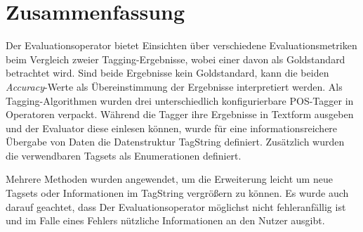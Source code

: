 \section{Zusammenfassung}
\label{sec:system:conclusion}

Der Evaluationsoperator bietet Einsichten über verschiedene Evaluationsmetriken beim Vergleich zweier Tagging-Ergebnisse, wobei einer davon als Goldstandard betrachtet wird. Sind beide Ergebnisse kein Goldstandard, kann die beiden \textit{Accuracy}-Werte als Übereinstimmung der Ergebnisse interpretiert werden. Als Tagging-Algorithmen wurden drei unterschiedlich konfigurierbare POS-Tagger in Operatoren verpackt. Während die Tagger ihre Ergebnisse in Textform ausgeben und der Evaluator diese einlesen können, wurde für eine informationsreichere Übergabe von Daten die Datenstruktur TagString definiert. Zusätzlich wurden die verwendbaren Tagsets als Enumerationen definiert.

Mehrere Methoden wurden angewendet, um die Erweiterung leicht um neue Tagsets oder Informationen im TagString vergrößern zu können. Es wurde auch darauf geachtet, dass Der Evaluationsoperator möglichst nicht fehleranfällig ist und im Falle eines Fehlers nützliche Informationen an den Nutzer ausgibt.